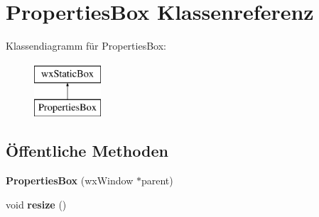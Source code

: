 \hypertarget{classPropertiesBox}{\section{Properties\-Box Klassenreferenz}
\label{classPropertiesBox}
}
Klassendiagramm für Properties\-Box\-:\begin{figure}[H]
\begin{center}
\leavevmode
\includegraphics[height=2.000000cm]{classPropertiesBox}
\end{center}
\end{figure}
\subsection*{Öffentliche Methoden}
\begin{DoxyCompactItemize}
\item 
\hypertarget{classPropertiesBox_a9218399db23aa9a4200ccf60edd74f5a}{{\bfseries Properties\-Box} (wx\-Window $\ast$parent)}\label{classPropertiesBox_a9218399db23aa9a4200ccf60edd74f5a}

\item 
\hypertarget{classPropertiesBox_adce6c28da4adced9bb98937c5cb85de0}{void {\bfseries resize} ()}\label{classPropertiesBox_adce6c28da4adced9bb98937c5cb85de0}

\end{DoxyCompactItemize}
